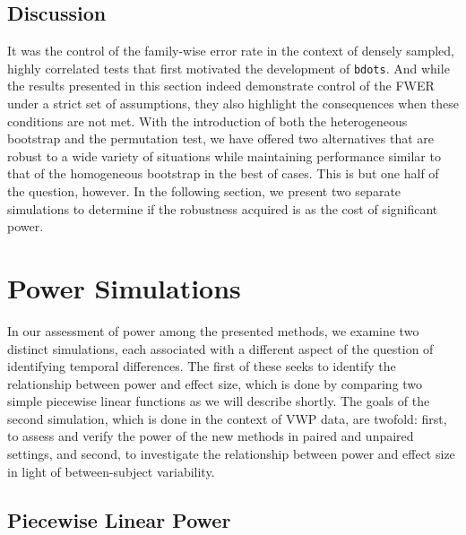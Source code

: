 \documentclass{article}
\newcommand{\xt}{\texttt}
\begin{document}
\subsection{Discussion}


It was the control of the family-wise error rate in the context of densely sampled, highly correlated tests that first motivated the development of \xt{bdots}. And while the results presented in this section indeed demonstrate control of the FWER under a strict set of assumptions, they also highlight the consequences when these conditions are not met. With the introduction of both the heterogeneous bootstrap and the permutation test, we have offered two alternatives that are robust to a wide variety of situations while maintaining performance similar to that of the homogeneous bootstrap in the best of cases. This is but one half of the question, however. In the following section, we present two separate simulations to determine if the robustness acquired is as the cost of significant power.



\section{Power Simulations}

In our assessment of power among the presented methods, we examine two distinct simulations, each associated with a different aspect of the question of identifying temporal differences. The first of these seeks to identify the relationship between power and effect size, which is done by comparing two simple piecewise linear functions as we will describe shortly. The goals of the second simulation, which is done in the context of VWP data, are twofold: first, to assess and verify the power of the new methods in paired and unpaired settings, and second, to investigate the relationship between power and effect size in light of between-subject variability.

\subsection{Piecewise Linear Power}
\end{document}
